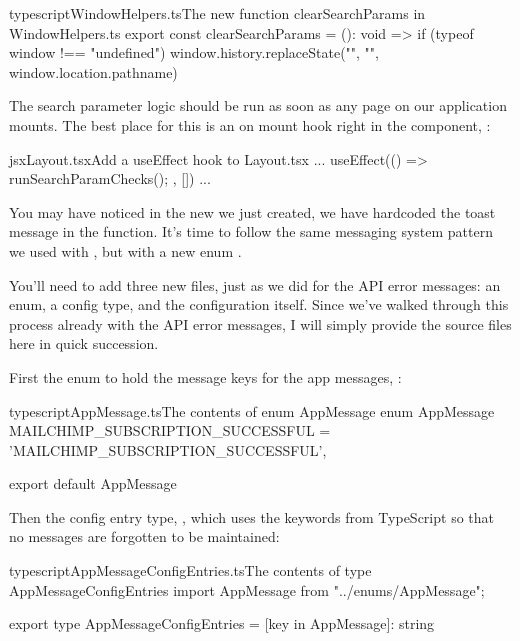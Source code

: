 \documentclass[a4paper,headinclude=on,footinclude=on,12pt,oneside]{scrbook}
\begin{document}
\begin{codeInput}{typescript}{WindowHelpers.ts}{The new function clearSearchParams in WindowHelpers.ts}
export const clearSearchParams = (): void => {
    if (typeof window !== "undefined") {
        window.history.replaceState("", "", window.location.pathname)
    }
}
\end{codeInput}


The search parameter logic should be run as soon as any page on our application mounts. The best place for this is an on mount hook right in the  component, :

\begin{codeInput}{jsx}{Layout.tsx}{Add a useEffect hook to Layout.tsx}
...
useEffect(() => {
  runSearchParamChecks();
}, [])
...
\end{codeInput}


You may have noticed in the new  we just created, we have hardcoded the toast message in the  function. It's time to follow the same messaging system pattern we used with , but with a new enum .

You'll need to add three new files, just as we did for the API error messages: an enum, a config type, and the configuration itself. Since we've walked through this process already with the API error messages, I will simply provide the source files here in quick succession.

First the enum to hold the message keys for the app messages, :

\begin{codeInput}{typescript}{AppMessage.ts}{The contents of enum AppMessage}
enum AppMessage {
  MAILCHIMP_SUBSCRIPTION_SUCCESSFUL = 'MAILCHIMP_SUBSCRIPTION_SUCCESSFUL',
}

export default AppMessage
\end{codeInput}

Then the config entry type,  , which uses the  keywords from TypeScript so that no messages are forgotten to be maintained:

\begin{codeInput}{typescript}{AppMessageConfigEntries.ts}{The contents of type AppMessageConfigEntries}
import AppMessage from "../enums/AppMessage";

export type AppMessageConfigEntries = {
    [key in AppMessage]: string
}
\end{codeInput}
\end{document}
